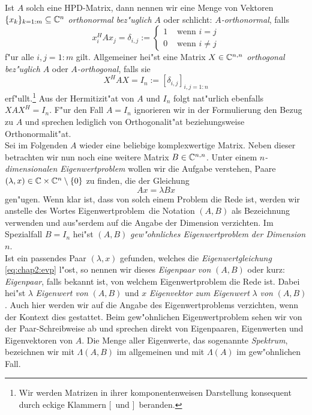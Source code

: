 Ist $A$ solch eine HPD-Matrix,
dann nennen wir eine Menge von Vektoren $\{x_k\}_{k=1:m}\subseteq\mathbb{C}^n$ \emph{orthonormal
bez"uglich} $A$ oder schlicht: \emph{$A$-orthonormal}, falls
\[
x_i^H A x_j = \delta_{i,j} := \begin{cases}
1 & \text{ wenn } i=j \\
0 & \text{ wenn } i\neq j
\end{cases}
\]
f"ur alle $i,j = 1:m$ gilt. Allgemeiner hei"st eine Matrix $X\in\mathbb{C}^{n,n}$ \emph{orthogonal bez"uglich} $A$ oder \emph{$A$-orthogonal}, falls sie
\[
X^H A X = I_n := [\delta_{i,j}]_{i,j=1:n}
\]
erf"ullt.\footnote{Wir werden Matrizen in ihrer komponentenweisen Darstellung konsequent durch eckige Klammern \glqq$[$\grqq\ und \glqq$]$\grqq\ beranden.} Aus der Hermitizit"at von $A$ und $I_n$ folgt nat"urlich ebenfalls $XAX^H = I_n$. F"ur den Fall $A=I_n$ ignorieren wir in der Formulierung den Bezug zu $A$ und sprechen lediglich von Orthogonalit"at beziehungsweise Orthonormalit"at.\\

Sei im Folgenden $A$ wieder eine beliebige komplexwertige Matrix. Neben dieser betrachten wir nun noch eine weitere Matrix $B\in\mathbb{C}^{n,n}$.
Unter einem \emph{$n$-dimensionalen Eigenwertproblem} wollen wir die Aufgabe verstehen, Paare $(\lambda,x)\in\mathbb{C}\times\mathbb{C}^n \setminus\{0\}$ zu finden, die der Gleichung
\begin{equation}\label{eq:chap2:evp}
Ax = \lambda Bx
\end{equation}
gen"ugen. Wenn klar ist, dass von solch einem Problem die Rede ist, werden wir anstelle des Wortes \glqq Eigenwertproblem\grqq\ die Notation $(A,B)$ als Bezeichnung verwenden und aus"serdem auf die Angabe der Dimension verzichten. Im Spezialfall $B=I_n$
hei"st $(A,B)$ \emph{gew"ohnliches Eigenwertproblem der Dimension $n$}.\\

Ist ein passendes Paar $(\lambda,x)$ gefunden, welches die \emph{Eigenwertgleichung} \eqref{eq:chap2:evp} l"ost, so nennen wir dieses \emph{Eigenpaar von} $(A,B)$ oder kurz: \emph{Eigenpaar}, falls bekannt ist, von welchem Eigenwertproblem die Rede ist.
Dabei hei"st $\lambda$ \emph{Eigenwert von} $(A,B)$ und $x$ \emph{Eigenvektor zum Eigenwert} $\lambda$ \emph{von} $(A,B)$. Auch hier werden wir auf die Angabe des Eigenwertproblems verzichten, wenn der Kontext dies gestattet.
Beim gew"ohnlichen Eigenwertproblem sehen wir von der Paar-Schreibweise ab und sprechen direkt von Eigenpaaren, Eigenwerten und Eigenvektoren von $A$.
Die Menge aller Eigenwerte, das sogenannte \emph{Spektrum}, bezeichnen wir mit $\Lambda(A,B)$ im allgemeinen und mit $\Lambda(A)$ im gew"ohnlichen Fall.\\

